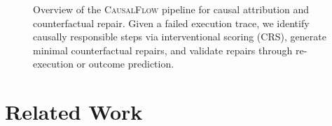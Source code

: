 \documentclass{article}
\theoremstyle{plain}
\theoremstyle{definition}
\theoremstyle{remark}
\begin{document}
\begin{figure}[t]
{
}
\caption{Overview of the \textsc{CausalFlow} pipeline for causal attribution and counterfactual repair. Given a failed execution trace, we identify causally responsible steps via interventional scoring (CRS), generate minimal counterfactual repairs, and validate repairs through re-execution or outcome prediction.}
\label{fig:pipeline}
\end{figure}


\section{Related Work}
\end{document}
